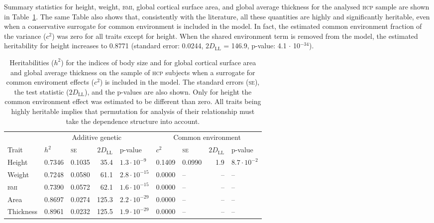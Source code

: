 Summary statistics for height, weight, \textsc{bmi}, global cortical surface area, and global average thickness for the analysed \textsc{hcp} sample are shown in Table~\ref{tab:heritabilities}. The same Table also shows that, consistently with the literature, all these quantities are highly and significantly heritable, even when a conservative surrogate for common environment is included in the model. In fact, the estimated common environment fraction of the variance ($c^2$) was zero for all traits except for height. When the shared environment term is removed from the model, the estimated heritability for height increases to 0.8771 (standard error: 0.0244, $2D_{\text{LL}}$ = 146.9, p-value: 4.1 $\cdot$ 10$^{-34}$).

\begin{table}[!tp]
\caption[Heritabilities for the indices of body size and for global cortical surface area and thickness.]{Heritabilities ($h^2$) for the indices of body size and for global cortical surface area and global average thickness on the sample of \textsc{hcp} subjects when a surrogate for common enviroment effects ($c^2$) is included in the model. The standard errors (\textsc{se}), the test statistic ($2D_{\text{LL}}$), and the p-values are also shown. Only for height the common environment effect was estimated to be different than zero. All traits being highly heritable implies that permutation for analysis of their relationship must take the dependence structure into account.}
{\small
\begin{center}
\hspace*{-3mm}\begin{tabular}{@{}lllrlllrl@{}}
\toprule
{} & \multicolumn{4}{c}{Additive genetic} & \multicolumn{4}{c}{Common environment}\\
\cmidrule(lr){2-5} \cmidrule(l){6-9}
Trait & $h^2$ & \textsc{se} & $2D_{\text{LL}}$ & p-value & $c^2$ & \textsc{se} & $2D_{\text{LL}}$ & p-value\\
\midrule
Height       & 0.7346 & 0.1035 & 35.4  & $1.3 \cdot 10^{-9}$  & 0.1409 & 0.0990 & 1.9 & $8.7 \cdot 10^{-2}$\\
Weight       & 0.7248 & 0.0580 & 61.1  & $2.8 \cdot 10^{-15}$ & 0.0000 & -- & -- & --\\
\textsc{bmi} & 0.7390 & 0.0572 & 62.1  & $1.6 \cdot 10^{-15}$ & 0.0000 & -- & -- & --\\
Area         & 0.8697 & 0.0274 & 125.3 & $2.2 \cdot 10^{-29}$ & 0.0000 & -- & -- & --\\
Thickness    & 0.8961 & 0.0232 & 125.5 & $1.9 \cdot 10^{-29}$ & 0.0000 & -- & -- & --\\
\bottomrule   
\end{tabular}
\end{center}}
\label{tab:heritabilities}
\end{table}

